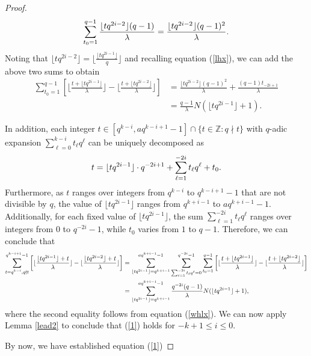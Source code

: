 \documentclass[journal,onecolumn]{IEEEtran}
\begin{document}
\begin{proof}
\begin{equation}\notag
    \sum\limits_{t_0=1}^{q-1}\frac{\lfloor tq^{2i-2}\rfloor(q-1)}{\lambda}  = \frac{\lfloor tq^{2i-2}\rfloor(q-1)^2}{\lambda}.
\end{equation}
Noting that $\lfloor tq^{2i-2}\rfloor=\lfloor\frac{\lfloor tq^{2i-1}\rfloor}{q}\rfloor$ and  
recalling equation (\ref{lhx}), we can add  
the above two sums  to  obtain 
\begin{equation}\label{whlx}
\begin{split}
    \sum\limits_{t_0=1}^{q-1}\left[
     \lfloor \frac{t+\lfloor tq^{2i-1} \rfloor}{\lambda}\rfloor-\lfloor \frac{t+\lfloor tq^{2i-2}\rfloor}{\lambda}\rfloor  \right]&= 
     \frac{\lfloor tq^{2i-2}\rfloor(q-1)^2}{\lambda} + \frac{(q-1)t_{-2i+1}}{\lambda}\\
    &=\frac{q-1}{\lambda}N(\lfloor tq^{2i-1}\rfloor+1).
    \end{split}
\end{equation}

In addition, each  integer  $t\in \left[q^{k-i}, aq^{k-i+1}-1\right]\cap \{t\in \mathbb{Z}: q\nmid t\}$ with $q$-adic expansion $\sum\limits_{\ell=0}^{k-i}t_{\ell}q^{\ell}$ can be uniquely decomposed  as   
 \begin{equation}\notag
t=\lfloor tq^{2i-1} \rfloor\cdot q^{-2i+1}+\sum\limits_{\ell=1}^{-2i}t_{\ell}q^{\ell}+t_0.
\end{equation}
Furthermore, as $ t $ ranges over integers from $ q^{k-i} $ to $q^{k-i+1} - 1$ that are not divisible by $ q $, the value of $ \lfloor tq^{2i-1} \rfloor $ ranges from $ q^{k+i-1} $ to $ aq^{k+i-1}-1$. Additionally, for each fixed value of $ \lfloor tq^{2i-1} \rfloor $,  the sum $ \sum\limits_{\ell=1}^{-2i} t_{\ell} q^{\ell} $ ranges over integers from $ 0 $ to $q^{-2i}-1$, while $ t_0 $ varies from $ 1 $ to $ q - 1 $.  Therefore, we can conclude that 
\begin{equation}\notag
\begin{split}
      \sum\limits_{\substack{t=q^{k-i}, q\nmid t}}^{ q^{k-i+1}-1}\left[\lfloor \frac{\lfloor tq^{2i-1}\rfloor+t}{\lambda}\rfloor -\lfloor \frac{\lfloor tq^{2i-2}\rfloor+t}{\lambda}\rfloor\right]&= \sum\limits_{\lfloor tq^{2i-1} \rfloor=q^{k+i-1}}^{aq^{k+i-1}-1 } 
\sum\limits_{\sum_{\ell=1}^{-2i}t_{\ell}q^{\ell}=0}^{q^{-2i}-1}\sum\limits_{t_0=1}^{q-1}\left[  \lfloor \frac{t+\lfloor tq^{2i-1} \rfloor}{\lambda}\rfloor-\lfloor \frac{t+\lfloor tq^{2i-2}\rfloor}{\lambda}\rfloor \right]\\
&=\sum\limits_{\lfloor tq^{2i-1} \rfloor=q^{k+i-1}}^{aq^{k+i-1}-1 }  \frac{q^{-2i}(q-1)}{\lambda}N(\lfloor tq^{2i-1}\rfloor+1),
\end{split}
\end{equation}
where the second equality follows from equation (\ref{whlx}).  We can now apply   Lemma \ref{lead2} to conclude that  (\ref{1})  holds for $-k+1\leq i\leq 0$.  

By now, we have established equation (\ref{1})
\end{proof}
\end{document}
